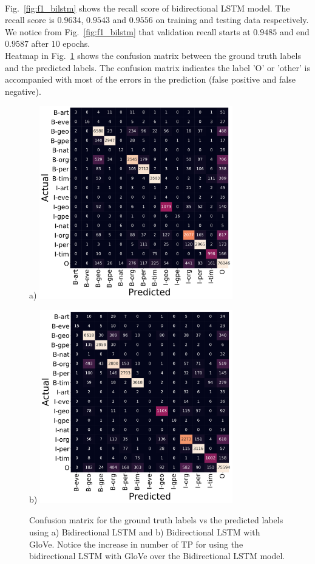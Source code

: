 \documentclass[sigconf, nonacm, natbib, screen, balance=False]{acmart}
\begin{document}
\hfill\\
Fig.~\ref{fig:f1_bilstm} shows the recall score of bidirectional LSTM model. The recall score is $0.9634$, $0.9543$ and $0.9556$  on training and testing data respectively. We notice from Fig.~\ref{fig:f1_bilstm} that validation recall starts at $0.9485$ and end $0.9587$ after $10$ epochs. 
\hfill\\
Heatmap in Fig.~\ref{fig:bilstmconfusion} shows the confusion matrix between the ground truth labels and the predicted labels. The confusion matrix indicates the label 'O' or 'other' is accompanied with most of the errors in the prediction (false positive and false negative).    

\begin{figure}
  \centering
  \begin{subfig}{a)}
  \includegraphics[width=84mm, frame]{../figures/conf_matrix.pdf}
  \end{subfig}
  \begin{subfig}{b)}
  \includegraphics[width=84mm, frame]{../figures/glove_conf_matrix.pdf}
  \end{subfig}
  \caption{Confusion matrix for the ground truth labels vs the predicted labels using a) Bidirectional LSTM and b) Bidirectional LSTM with GloVe. Notice the increase in number of TP for using the bidirectional LSTM with GloVe over the Bidirectional LSTM model.}
  \label{fig:bilstmconfusion}
\end{figure}
\end{document}
